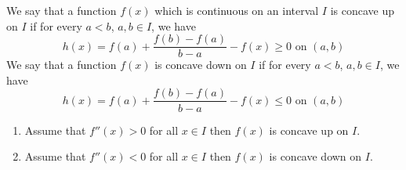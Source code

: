 \begin{defn}[Concavity]
We say that a function $f(x)$ which is continuous on an interval $I$ is concave up on $I$ if for every $a< b$, $a,b \in I$, we have
\[h(x) = f(a) + \frac{f(b) - f(a)}{b-a} - f(x) \geq 0 \text{ on }(a,b)\]
We say that a function $f(x)$ is concave down on $I$ if for every $a< b$, $a,b \in I$, we have
\[h(x) = f(a) + \frac{f(b) - f(a)}{b-a} - f(x) \leq 0 \text{ on }(a,b)\]
\end{defn}

\begin{thm}\leavevmode

\begin{enumerate}
\item Assume that $f''(x) > 0$ for all $x\in I$ then $f(x)$ is concave up on $I$.
\item Assume that $f''(x) < 0$ for all $x\in I$ then $f(x)$ is concave down on $I$.
\end{enumerate}
\end{thm}